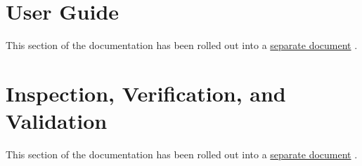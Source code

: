 \documentclass[twoside,11pt,titlepage]{report}
\begin{document}
\chapter{User Guide}

This section of the documentation has been rolled out into a
\href{file:TrickHLAUser.pdf}{separate document}
\cite{trickhlaenv:TrickHLAUser}.

\chapter{Inspection, Verification, and Validation}

This section of the documentation has been rolled out into a
\href{file:TrickHLAIVV.pdf}{separate document}
\cite{trickhlaenv:TrickHLAIVV}.

\newpage
{}



\end{document}
